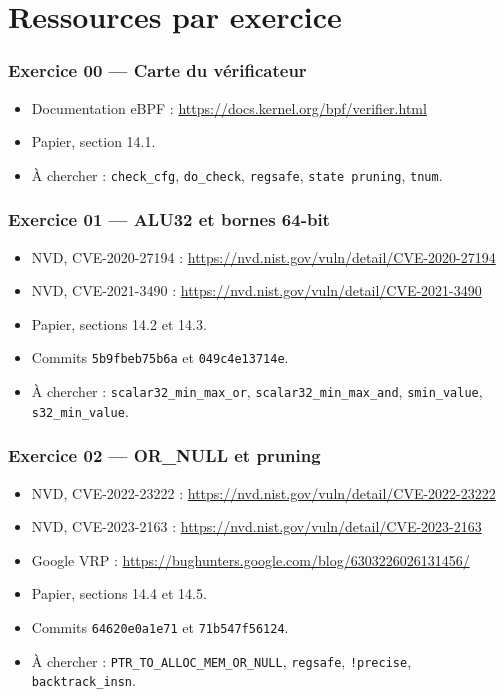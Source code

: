 \documentclass{training}
\begin{document}
\chapter{Ressources par exercice}

\subsection*{Exercice 00 --- Carte du vérificateur}
\begin{itemize}
  \item Documentation eBPF :
        \url{https://docs.kernel.org/bpf/verifier.html}
  \item Papier, section 14.1.
  \item À chercher : \texttt{check\_cfg}, \texttt{do\_check},
        \texttt{regsafe}, \texttt{state pruning}, \texttt{tnum}.
\end{itemize}

\subsection*{Exercice 01 --- ALU32 et bornes 64-bit}
\begin{itemize}
  \item NVD, CVE-2020-27194 :
        \url{https://nvd.nist.gov/vuln/detail/CVE-2020-27194}
  \item NVD, CVE-2021-3490 :
        \url{https://nvd.nist.gov/vuln/detail/CVE-2021-3490}
  \item Papier, sections 14.2 et 14.3.
  \item Commits \texttt{5b9fbeb75b6a} et \texttt{049c4e13714e}.
  \item À chercher : \texttt{scalar32\_min\_max\_or},
        \texttt{scalar32\_min\_max\_and}, \texttt{smin\_value}, \texttt{s32\_min\_value}.
\end{itemize}

\subsection*{Exercice 02 --- OR\_NULL et pruning}
\begin{itemize}
  \item NVD, CVE-2022-23222 :
        \url{https://nvd.nist.gov/vuln/detail/CVE-2022-23222}
  \item NVD, CVE-2023-2163 :
        \url{https://nvd.nist.gov/vuln/detail/CVE-2023-2163}
  \item Google VRP :
        \url{https://bughunters.google.com/blog/6303226026131456/}
  \item Papier, sections 14.4 et 14.5.
  \item Commits \texttt{64620e0a1e71} et \texttt{71b547f56124}.
  \item À chercher : \texttt{PTR\_TO\_ALLOC\_MEM\_OR\_NULL},
        \texttt{regsafe}, \texttt{!precise}, \texttt{backtrack\_insn}.
\end{itemize}
\end{document}
